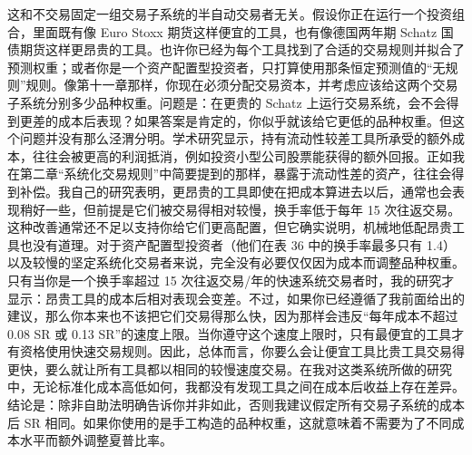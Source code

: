 \begin{chineseblock}这和不交易固定一组交易子系统的半自动交易者无关。假设你正在运行一个投资组合，里面既有像 Euro Stoxx 期货这样便宜的工具，也有像德国两年期 Schatz 国债期货这样更昂贵的工具。也许你已经为每个工具找到了合适的交易规则并拟合了预测权重；或者你是一个资产配置型投资者，只打算使用那条恒定预测值的“无规则”规则。像第十一章那样，你现在必须分配交易资本，并考虑应该给这两个交易子系统分别多少品种权重。问题是：在更贵的 Schatz 上运行交易系统，会不会得到更差的成本后表现？如果答案是肯定的，你似乎就该给它更低的品种权重。但这个问题并没有那么泾渭分明。学术研究显示，持有流动性较差工具所承受的额外成本，往往会被更高的利润抵消，例如投资小型公司股票能获得的额外回报。正如我在第二章“系统化交易规则”中简要提到的那样，暴露于流动性差的资产，往往会得到补偿。我自己的研究表明，更昂贵的工具即使在把成本算进去以后，通常也会表现稍好一些，但前提是它们被交易得相对较慢，换手率低于每年 15 次往返交易。这种改善通常还不足以支持你给它们更高配置，但它确实说明，机械地低配昂贵工具也没有道理。对于资产配置型投资者（他们在表 36 中的换手率最多只有 1.4）以及较慢的坚定系统化交易者来说，完全没有必要仅仅因为成本而调整品种权重。只有当你是一个换手率超过 15 次往返交易/年的快速系统交易者时，我的研究才显示：昂贵工具的成本后相对表现会变差。不过，如果你已经遵循了我前面给出的建议，那么你本来也不该把它们交易得那么快，因为那样会违反“每年成本不超过 0.08 SR 或 0.13 SR”的速度上限。当你遵守这个速度上限时，只有最便宜的工具才有资格使用快速交易规则。因此，总体而言，你要么会让便宜工具比贵工具交易得更快，要么就让所有工具都以相同的较慢速度交易。在我对这类系统所做的研究中，无论标准化成本高低如何，我都没有发现工具之间在成本后收益上存在差异。结论是：除非自助法明确告诉你并非如此，否则我建议假定所有交易子系统的成本后 SR 相同。如果你使用的是手工构造的品种权重，这就意味着不需要为了不同成本水平而额外调整夏普比率。\end{chineseblock}




